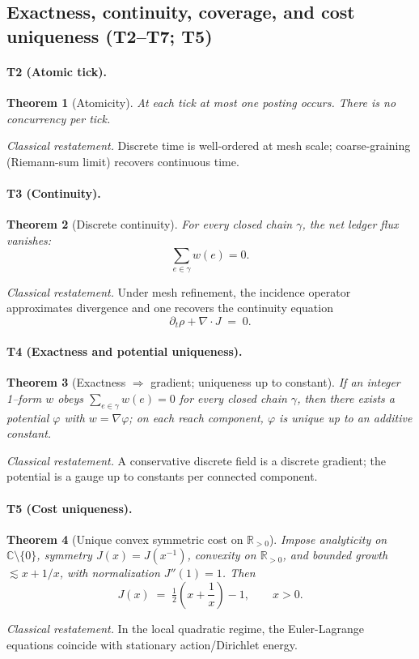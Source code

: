 \documentclass[11pt]{article}
\newtheorem{theorem}{Theorem}[section]
\begin{document}
\subsection{Exactness, continuity, coverage, and cost uniqueness (T2--T7; T5)}\label{subsec:exactness-continuity-coverage}

\paragraph{T2 (Atomic tick).}
\begin{theorem}[Atomicity]\label{thm:T2}
At each tick at most one posting occurs. There is no concurrency per tick.
\end{theorem}
\emph{Classical restatement.} Discrete time is well-ordered at mesh scale; coarse-graining (Riemann-sum limit) recovers continuous time.

\paragraph{T3 (Continuity).}
\begin{theorem}[Discrete continuity]\label{thm:T3}
For every closed chain $\gamma$, the net ledger flux vanishes:
\[
\sum_{e\in \gamma} w(e)=0.
\]
\end{theorem}
\emph{Classical restatement.} Under mesh refinement, the incidence operator approximates divergence and one recovers the continuity equation
\[
\partial_t \rho + \nabla\!\cdot\! J \;=\; 0.
\] 

\paragraph{T4 (Exactness and potential uniqueness).}
\begin{theorem}[Exactness $\Rightarrow$ gradient; uniqueness up to constant]\label{thm:T4}
If an integer 1--form $w$ obeys $\sum_{e\in\gamma}w(e)=0$ for every closed chain $\gamma$, then there exists a potential $\varphi$ with $w=\nabla \varphi$; on each reach component, $\varphi$ is unique up to an additive constant.
\end{theorem}
\emph{Classical restatement.} A conservative discrete field is a discrete gradient; the potential is a gauge up to constants per connected component.

\paragraph{T5 (Cost uniqueness).}
\begin{theorem}[Unique convex symmetric cost on $\mathbb{R}_{>0}$]\label{thm:T5}
Impose analyticity on $\mathbb{C}\setminus\{0\}$, symmetry $J(x)=J(x^{-1})$, convexity on $\mathbb{R}_{>0}$, and bounded growth $\lesssim x+1/x$, with normalization $J''(1)=1$. Then
\[
J(x) \;=\; \tfrac12\!\left(x + \frac{1}{x}\right) - 1,\qquad x>0.
\]
\end{theorem}
\emph{Classical restatement.} In the local quadratic regime, the Euler-Lagrange equations coincide with stationary action/Dirichlet energy.
\end{document}
